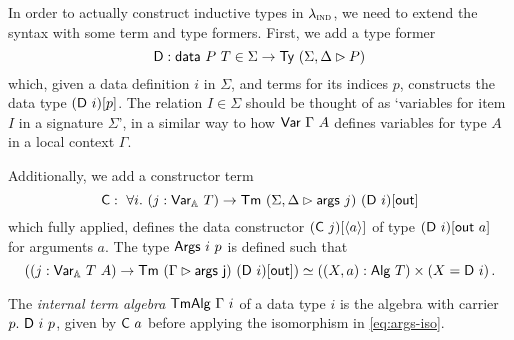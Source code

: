 In order to actually construct inductive types in $\lambda_{\textsc{ind}}$, we need to
extend the syntax with some term and type formers. First, we add a type former
\[
	\mta{D} : \mta{data}\ P\ T \in \Sigma \to \Ty\ (\Sigma, \Delta \rhd P)
\]
which, given a data definition $i$ in $\Sigma$, and terms for its
indices $p$, constructs the data type $(\mta{D}\ i)[p]$. The relation $I \in
	\Sigma$ should be thought of as `variables for item $I$ in a signature
$\Sigma$', in a similar way to how $\mta{Var}\ \Gamma\ A$ defines variables for
type $A$ in a local context $\Gamma$.

Additionally, we add a constructor term
\[
	\mta{C} :\ \forall i.\ (j : \mta{Var}_{\mathbb{A}}\ T) \to \Tm\ (\Sigma, \Delta \rhd \mta{args}\ j)\ (\mta{D}\ i)[\mta{out}] \\
\]
which fully applied, defines the data constructor $(\textsf{C}\ j)[\langle a\rangle]$ of type
$(\textsf{D}\ i)[\textsf{out}\ a]$ for arguments $a$. The type $\textsf{Args}\ i\ p$ is defined such
that
\begin{equation}
	((j : \mta{Var}_{\mathbb{A}}\ T\ A) \to \Tm\ (\Gamma \rhd \mta{args\ j})\ (\mta{D}\ i)[\mta{out}]) \simeq ((X, a) : \mta{Alg}\ T) \times (X = \mta{D}\ i) \,.\label{eq:args-iso}
\end{equation}

\begin{definition}
	The \emph{internal term algebra} $\textsf{TmAlg}\ \Gamma\ i$ of a data type $i$ is
	the algebra with carrier $p .\ \mta{D}\ i\ p$, given by $\textsf{C}\ a$
	before applying the isomorphism in \eqref{eq:args-iso}.
\end{definition}


